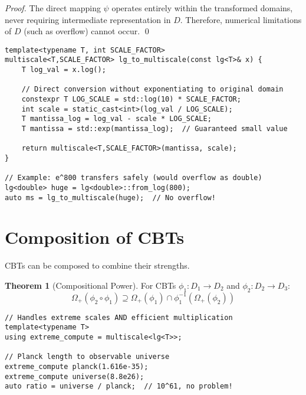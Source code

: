 \documentclass[12pt,a4paper]{article}
\theoremstyle{definition}
\newtheorem{theorem}{Theorem}
\begin{document}
\begin{proof}
The direct mapping $\psi$ operates entirely within the transformed domains, never requiring intermediate representation in $D$. Therefore, numerical limitations of $D$ (such as overflow) cannot occur. \qed
\end{proof}

\begin{lstlisting}[caption={Direct lg to multiscale mapping avoiding overflow}]
template<typename T, int SCALE_FACTOR>
multiscale<T,SCALE_FACTOR> lg_to_multiscale(const lg<T>& x) {
    T log_val = x.log();
    
    // Direct conversion without exponentiating to original domain
    constexpr T LOG_SCALE = std::log(10) * SCALE_FACTOR;
    int scale = static_cast<int>(log_val / LOG_SCALE);
    T mantissa_log = log_val - scale * LOG_SCALE;
    T mantissa = std::exp(mantissa_log);  // Guaranteed small value
    
    return multiscale<T,SCALE_FACTOR>(mantissa, scale);
}

// Example: e^800 transfers safely (would overflow as double)
lg<double> huge = lg<double>::from_log(800);
auto ms = lg_to_multiscale(huge);  // No overflow!
\end{lstlisting}

\section{Composition of CBTs}

CBTs can be composed to combine their strengths.

\begin{theorem}[Compositional Power]
For CBTs $\phi_1: D_1 \to D_2$ and $\phi_2: D_2 \to D_3$:
\begin{equation}
\Omega_{+}(\phi_2 \circ \phi_1) \supseteq \Omega_+(\phi_1) \cap \phi_1^{-1}(\Omega_+(\phi_2))
\end{equation}
\end{theorem}

\begin{lstlisting}[caption={Composed transform: multiscale<lg<T>>}]
// Handles extreme scales AND efficient multiplication
template<typename T>
using extreme_compute = multiscale<lg<T>>;

// Planck length to observable universe
extreme_compute planck(1.616e-35);
extreme_compute universe(8.8e26);
auto ratio = universe / planck;  // 10^61, no problem!
\end{lstlisting}
\end{document}
